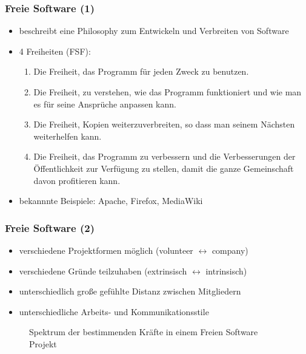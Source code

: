 \documentclass{beamer}
\begin{document}
\begin{frame}
\frametitle{Freie Software (1)}
\begin{itemize}
 \item beschreibt eine Philosophy zum Entwickeln und Verbreiten von Software
 \item 4 Freiheiten (FSF):
    \begin{enumerate}
      \item Die Freiheit, das Programm für jeden Zweck zu benutzen.
      \item Die Freiheit, zu verstehen, wie das Programm funktioniert und wie man es für seine Ansprüche anpassen kann.
      \item Die Freiheit, Kopien weiterzuverbreiten, so dass man seinem Nächsten weiterhelfen kann.
      \item Die Freiheit, das Programm zu verbessern und die Verbesserungen der Öffentlichkeit zur Verfügung zu stellen, damit die ganze Gemeinschaft davon profitieren kann.
    \end{enumerate}
 \item bekannnte Beispiele: Apache, Firefox, MediaWiki
\end{itemize}
\end{frame}

\begin{frame}
\frametitle{Freie Software (2)}
\begin{itemize}
 \item verschiedene Projektformen m\"oglich (volunteer $\leftrightarrow$ company)
 \item verschiedene Gr\"unde teilzuhaben (extrinsisch $\leftrightarrow$ intrinsisch)
 \item unterschiedlich gro\ss e gef\"uhlte Distanz zwischen Mitgliedern
 \item unterschiedliche Arbeits- und Kommunikationsstile
\end{itemize}
\begin{figure}[h]
	\centering
		\caption{Spektrum der bestimmenden Kr\"afte in einem Freien Software Projekt}
	\label{spectrumofprojectdriver}
\end{figure}
\end{frame}
\end{document}
